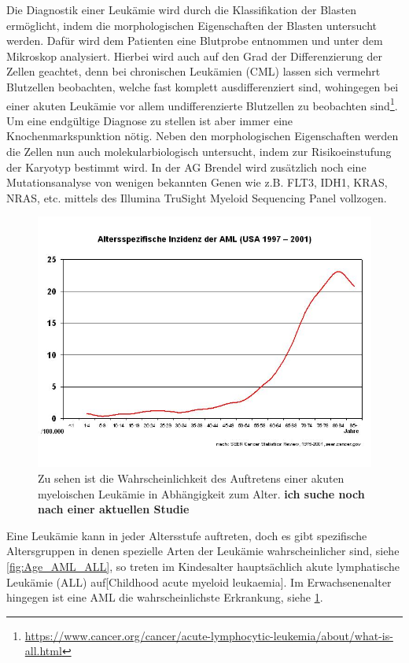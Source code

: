 Die Diagnostik einer Leukämie wird durch die Klassifikation der Blasten ermöglicht, indem die morphologischen Eigenschaften der Blasten untersucht werden. Dafür wird dem Patienten eine Blutprobe entnommen und unter dem Mikroskop analysiert. Hierbei wird auch auf den Grad der Differenzierung der Zellen geachtet, denn bei chronischen Leukämien (CML) lassen sich vermehrt Blutzellen beobachten, welche fast komplett ausdifferenziert sind, wohingegen bei einer akuten Leukämie vor allem undifferenzierte Blutzellen zu beobachten sind\footnote{\url{https://www.cancer.org/cancer/acute-lymphocytic-leukemia/about/what-is-all.html}}. Um eine endgültige Diagnose zu stellen ist aber immer eine Knochenmarkspunktion nötig. Neben den morphologischen Eigenschaften werden die Zellen nun auch molekularbiologisch untersucht, indem zur Risikoeinstufung der Karyotyp bestimmt wird. In der AG Brendel wird zusätzlich noch eine Mutationsanalyse von wenigen bekannten Genen wie z.B. FLT3, IDH1, KRAS, NRAS, etc. mittels des Illumina TruSight Myeloid Sequencing Panel vollzogen.

\begin{figure}
\centering
\includegraphics[width=.95\textwidth]{images/Alter_AML_2001.jpg}
\caption{Zu sehen ist die Wahrscheinlichkeit des Auftretens einer akuten myeloischen Leukämie in Abhängigkeit zum Alter. \textbf{ich suche noch nach einer aktuellen Studie}}
\label{fig:Alter_AML}
\end{figure}
Eine Leukämie kann in jeder Altersstufe auftreten, doch es gibt spezifische Altersgruppen in denen spezielle Arten der Leukämie wahrscheinlicher sind, siehe \ref{fig:Age_AML_ALL}, so treten im Kindesalter hauptsächlich akute lymphatische Leukämie (ALL) auf[Childhood acute myeloid leukaemia]. Im Erwachsenenalter hingegen ist eine AML die wahrscheinlichste Erkrankung, siehe \ref{fig:Alter_AML}.

